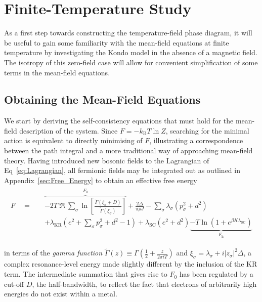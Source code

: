 
\section{Finite-Temperature Study}
\label{sec:finite_temperature}

As a first step towards constructing the temperature-field phase diagram, it will be useful to gain some familiarity with the mean-field equations at finite temperature by investigating the Kondo model in the absence of a magnetic field. The isotropy of this zero-field case will allow for convenient simplification of some terms in the mean-field equations.

\subsection{Obtaining the Mean-Field Equations}
\label{subsec:obtaining_MF}

We start by deriving the self-consistency equations that must hold for the mean-field description of the system. Since $ F = - k_{\text{B}} T \ln{Z} $, searching for the minimal action is equivalent to directly minimising of $ F $, illustrating a correspondence between the path integral and a more traditional way of approaching mean-field theory. Having introduced new bosonic fields to the Lagrangian of Eq~\eqref{eq:Lagrangian}, all fermionic fields may be integrated out as outlined in Appendix~\ref{sec:Free_Energy} to obtain an effective free energy
\begin{align}
\begin{split}
F \quad = \quad & \overbrace{- 2 T~\Re~{\sum_{\sigma}\ln{\left[\frac{\widetilde{\Gamma}(\xi_{\sigma} + D)}{\widetilde{\Gamma}(\xi_{\sigma})} \right]}}}^{F_0} + \frac{2 \Delta}{\pi \rho J} - \sum_{\sigma} \lambda_{\sigma} (p_{\sigma}^2 + d^2)\\
&+ \lambda_{\text{KR}} (e^2 + \sum_{\sigma} p_{\sigma}^2 + d^2 - 1) + \lambda_{\text{SC}} (e^2 + d^2) \underbrace{- T \ln{\left( 1 + e^{\beta K \lambda_{\text{SC}}} \right)}}_{F_{\text{h}}}
\label{eq:Free_Energy}
\end{split}
\end{align}

in terms of the \textit{gamma function} $ \widetilde{\Gamma} (z) \equiv \Gamma (\frac{1}{2} + \frac{z}{2 \pi i T}) $ and $ \xi_{\sigma} = \lambda_{\sigma} + i |z_{\sigma}|^2 \Delta $, a complex resonance-level energy made slightly different by the inclusion of the KR term. The intermediate summation that gives rise to $ F_0 $ has been regulated by a cut-off $ D $, the half-bandwidth, to reflect the fact that electrons of arbitrarily high energies do not exist within a metal.

